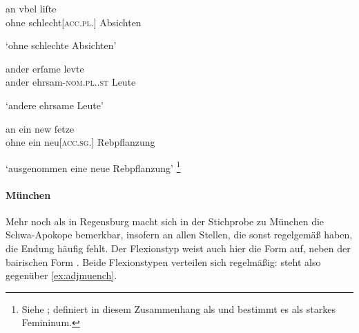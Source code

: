 \begin{exe}
\ex \label{ex:adjregbge}
	\begin{xlist}
	\ex \label{ex:adjregbge_3}
		\gll an vbel liſte \\
			ohne schlecht[\textsc{acc.pl.\MascI}] Absichten \\
		\begin{taggedline}{\parencites(Laaber, Kr.~Regensburg, 1294)[\pno~1970, 224.26]{cao3}}
		\trans `ohne schlechte Absichten'
		\end{taggedline}

	\ex \label{ex:adjregbge_1}
		\gll ander erſame levte \\
			ander ehrsam-\textsc{nom.pl.\MascA.st} Leute \\
		\begin{taggedline}{\parencites(Regensburg, 1299)[\pno~3404, 507.43]{cao4}}
		\trans `andere ehrsame Leute'
		\end{taggedline}

	\ex \label{ex:adjregbge_2}
		\gll an ein new ſetze \\
			ohne ein neu[\textsc{acc.sg.\FemI}] Rebpflanzung \\
		\begin{taggedline}{\parencites(Regensburg, 1290)[\pno~N~447, 328.38]{cao5}}
		\trans `ausgenommen eine neue Rebpflanzung'%
			\footnote{Siehe \citet[]{caor}; \citet[\pno~]{%
				lexer:mhdhwb} definiert  in diesem Zusammenhang als
				 und bestimmt es als starkes Femininum.}
		\end{taggedline}
	\end{xlist}
\end{exe}

\paragraph{München}
\label{par:adjmuenchen}
Mehr noch als in Regensburg macht sich in der Stichprobe zu München die
Schwa-Apokope bemerkbar, insofern an allen Stellen, die sonst regelgemäß
 haben, die Endung häufig fehlt. Der Flexionstyp  weist
auch hier die Form  auf, neben der bairischen Form . Beide
Flexionstypen verteilen sich regelmäßig:  steht also 
gegenüber \cref{ex:adjmuench}.


